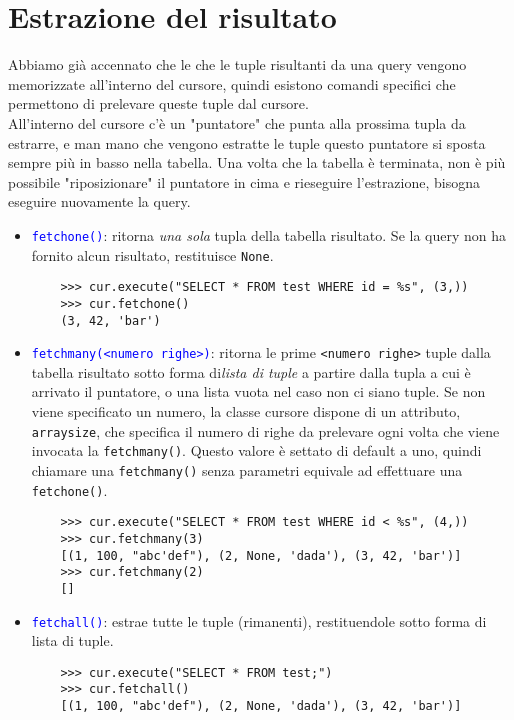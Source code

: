 \documentclass[12pt,a4paper]{book}
\begin{document}
	\section{Estrazione del risultato}
	Abbiamo già accennato che le  che le tuple risultanti da una query vengono memorizzate all'interno del cursore, quindi esistono comandi specifici che permettono di prelevare queste tuple dal cursore.\\All'interno del cursore c'è un "puntatore" che punta alla prossima tupla da estrarre, e man mano che vengono estratte le tuple questo puntatore si sposta sempre più in basso nella tabella. Una volta che la tabella è terminata, non è più possibile "riposizionare" il puntatore in cima e rieseguire l'estrazione, bisogna eseguire nuovamente la query.
	\begin{itemize}
		\item \textcolor{blue}{\texttt{fetchone()}}: ritorna \textit{una sola} tupla della tabella risultato. Se la query non ha fornito alcun risultato, restituisce \texttt{None}.
		\begin{lstlisting}
	>>> cur.execute("SELECT * FROM test WHERE id = %s", (3,)) 
	>>> cur.fetchone()
	(3, 42, 'bar')
		\end{lstlisting}
		\item \textcolor{blue}{\texttt{fetchmany(<numero righe>)}}: ritorna le prime \texttt{<numero righe>} tuple dalla tabella risultato sotto forma di\textit{lista di tuple} a partire dalla tupla a cui è arrivato il puntatore, o una lista vuota nel caso non ci siano tuple. Se non viene specificato un numero, la classe cursore dispone di un attributo, \texttt{arraysize}, che specifica il numero di righe da prelevare ogni volta che viene invocata la \texttt{fetchmany()}. Questo valore è settato di default a uno, quindi chiamare una \texttt{fetchmany()} senza parametri equivale ad effettuare una \texttt{fetchone()}. 
		\begin{lstlisting}
	>>> cur.execute("SELECT * FROM test WHERE id < %s", (4,)) 
	>>> cur.fetchmany(3)
	[(1, 100, "abc'def"), (2, None, 'dada'), (3, 42, 'bar')]
	>>> cur.fetchmany(2)
	[]
		\end{lstlisting}
		\item \textcolor{blue}{\texttt{fetchall()}}: estrae tutte le tuple (rimanenti), restituendole sotto forma di lista di tuple.
		\begin{lstlisting}
	>>> cur.execute("SELECT * FROM test;")
	>>> cur.fetchall()
	[(1, 100, "abc'def"), (2, None, 'dada'), (3, 42, 'bar')]
		\end{lstlisting}
	\end{itemize}
\end{document}
